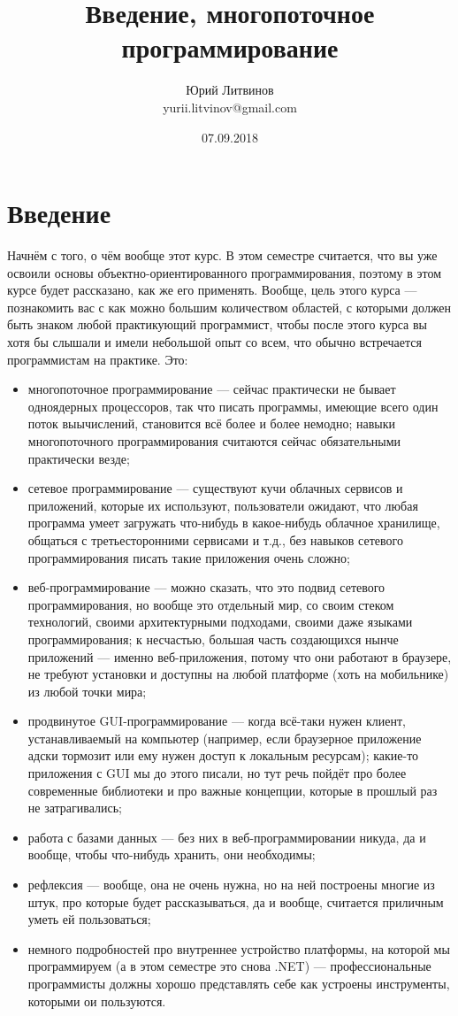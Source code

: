 \documentclass[a5paper]{article}
\title{Введение, многопоточное программирование}
\author{Юрий Литвинов\\\small{yurii.litvinov@gmail.com}}
\date{07.09.2018}
\begin{document}
\maketitle
\thispagestyle{empty}

\section{Введение}

Начнём с того, о чём вообще этот курс. В этом семестре считается, что вы уже освоили основы объектно-ориентированного программирования, поэтому в этом курсе будет рассказано, как же его применять. Вообще, цель этого курса --- познакомить вас с как можно большим количеством областей, с которыми должен быть знаком любой практикующий программист, чтобы после этого курса вы хотя бы слышали и имели небольшой опыт со всем, что обычно встречается программистам на практике. Это:

\begin{itemize}
	\item многопоточное программирование --- сейчас практически не бывает одноядерных процессоров, так что писать программы, имеющие всего один поток выычислений, становится всё более и более немодно; навыки многопоточного программирования считаются сейчас обязательными практически везде;
	\item сетевое программирование --- существуют кучи облачных сервисов и приложений, которые их используют, пользователи ожидают, что любая программа умеет загружать что-нибудь в какое-нибудь облачное хранилище, общаться с третьесторонними сервисами и т.д., без навыков сетевого программирования писать такие приложения очень сложно;
	\item веб-программирование --- можно сказать, что это подвид сетевого программирования, но вообще это отдельный мир, со своим стеком технологий, своими архитектурными подходами, своими даже языками программирования; к несчастью, большая часть создающихся нынче приложений --- именно веб-приложения, потому что они работают в браузере, не требуют установки и доступны на любой платформе (хоть на мобильнике) из любой точки мира;
	\item продвинутое GUI-программирование --- когда всё-таки нужен клиент, устанавливаемый на компьютер (например, если браузерное приложение адски тормозит или ему нужен доступ к локальным ресурсам); какие-то приложения с GUI мы до этого писали, но тут речь пойдёт про более современные библиотеки и про важные концепции, которые в прошлый раз не затрагивались;
	\item работа с базами данных --- без них в веб-программировании никуда, да и вообще, чтобы что-нибудь хранить, они необходимы;
	\item рефлексия --- вообще, она не очень нужна, но на ней построены многие из штук, про которые будет рассказываться, да и вообще, считается приличным уметь ей пользоваться;
	\item немного подробностей про внутреннее устройство платформы, на которой мы программируем (а в этом семестре это снова .NET) --- профессиональные программисты должны хорошо представлять себе как устроены инструменты, которыми ои пользуются.
\end{itemize}
\end{document}
